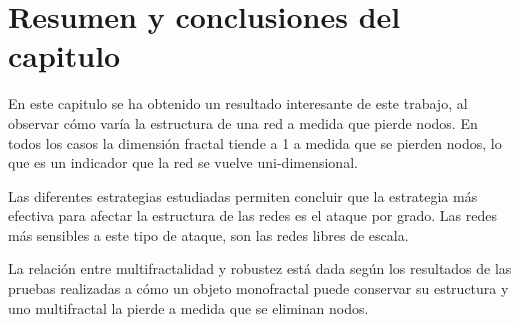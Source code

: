 \newpage
\section{Resumen y conclusiones del capitulo}

En este capitulo se ha obtenido un resultado interesante de este trabajo, al observar cómo varía la estructura de una red a medida que pierde nodos. En todos los casos la dimensión fractal tiende a 1 a medida que se pierden nodos, lo que es un indicador que la red se vuelve uni-dimensional.

Las diferentes estrategias estudiadas permiten concluir que la estrategia más efectiva para afectar la estructura de las redes es el ataque por grado. Las redes más sensibles a este tipo de ataque, son las redes libres de escala.

La relación entre multifractalidad y robustez está dada según los resultados de las pruebas realizadas a cómo un objeto monofractal puede conservar su estructura y uno multifractal la pierde a medida que se eliminan nodos.
